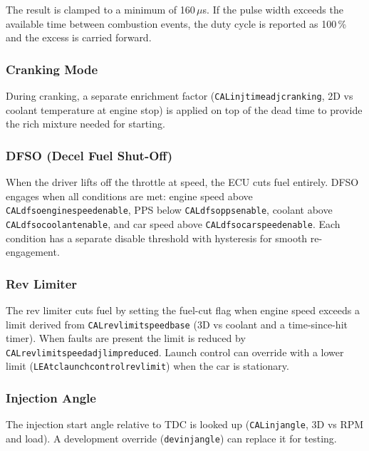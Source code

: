 \documentclass[a4paper,11pt]{article}
\renewcommand{\_}{\oldunderscore\allowbreak}
\begin{document}
The result is clamped to a minimum of 160\,$\mu$s. If the pulse width exceeds
the available time between combustion events, the duty cycle is reported as
100\,\% and the excess is carried forward.

\subsubsection*{Cranking Mode}

During cranking, a separate enrichment factor
(\texttt{CAL\_inj\_time\_adj\_cranking}, 2D vs coolant temperature at engine
stop) is applied on top of the dead time to provide the rich mixture needed for
starting.

\subsubsection*{DFSO (Decel Fuel Shut-Off)}

When the driver lifts off the throttle at speed, the ECU cuts fuel entirely.
DFSO engages when all conditions are met: engine speed above
\texttt{CAL\_dfso\_engine\_speed\_enable}, PPS below
\texttt{CAL\_dfso\_pps\_enable}, coolant above
\texttt{CAL\_dfso\_coolant\_enable}, and car speed above
\texttt{CAL\_dfso\_car\_speed\_enable}. Each condition has a separate
disable threshold with hysteresis for smooth re-engagement.

\subsubsection*{Rev Limiter}

The rev limiter cuts fuel by setting the fuel-cut flag when engine speed
exceeds a limit derived from \texttt{CAL\_revlimit\_speed\_base} (3D vs
coolant and a time-since-hit timer). When faults are present the limit is
reduced by \texttt{CAL\_revlimit\_speed\_adj\_limp\_reduced}. Launch control
can override with a lower limit (\texttt{LEA\_tc\_launchcontrol\_revlimit})
when the car is stationary.

\subsubsection*{Injection Angle}

The injection start angle relative to TDC is looked up
(\texttt{CAL\_inj\_angle}, 3D vs RPM and load). A development override
(\texttt{dev\_inj\_angle}) can replace it for testing.
\end{document}
